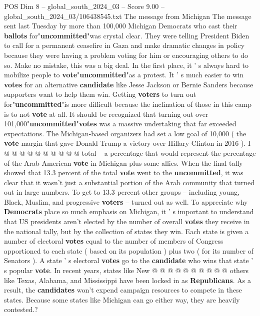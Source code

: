 \begin{textsample}{POS Dim 8 – global\_south\_2024\_03 – Score 9.00 – global\_south\_2024\_03/106438545.txt}  \label{ex:f8_pos_093}
The message from Michigan The message sent last Tuesday by more than 100,000 Michigan Democrats who cast their \textbf{ballots} for"\textbf{uncommitted}"was crystal clear.
They were telling President Biden to call for a permanent ceasefire in Gaza and make dramatic changes in policy because they were having a problem voting for him or encouraging others to do so.
Make no mistake, this was a big deal.
In the first place, it ' s always hard to mobilize people to \textbf{vote}"\textbf{uncommitted}"as a protest.
It ' s much easier to win \textbf{votes} for an alternative \textbf{candidate} like Jesse Jackson or Bernie Sanders because supporters want to help them win.
Getting \textbf{voters} to turn out for"\textbf{uncommitted}"is more difficult because the inclination of those in this camp is to not \textbf{vote} at all.
It should be recognized that turning out over 101,000"\textbf{uncommitted}"\textbf{votes} was a massive undertaking that far exceeded expectations.
The Michigan-based organizers had set a low goal of 10,000 ( the \textbf{vote} margin that gave Donald Trump a victory over Hillary Clinton in 2016 ).
I @ @ @ @ @ @ @ @ @ @ total -- a percentage that would represent the percentage of the Arab American \textbf{vote} in Michigan plus some allies.
When the final tally showed that 13.3 percent of the total \textbf{vote} went to the \textbf{uncommitted}, it was clear that it wasn't just a substantial portion of the Arab community that turned out in large numbers.
To get to 13.3 percent other groups -- including young, Black, Muslim, and progressive \textbf{voters} -- turned out as well.
To appreciate why \textbf{Democrats} place so much emphasis on Michigan, it ' s important to understand that US presidents aren't elected by the number of overall \textbf{votes} they receive in the national tally, but by the collection of states they win.
Each state is given a number of electoral \textbf{votes} equal to the number of members of Congress apportioned to each state ( based on its population ) plus two ( for its number of Senators ).
A state ' s electoral \textbf{votes} go to the \textbf{candidate} who wins that state ' s popular \textbf{vote}.
In recent years, states like New @ @ @ @ @ @ @ @ @ @ others like Texas, Alabama, and Mississippi have been locked in as \textbf{Republicans}.
As a result, the \textbf{candidates} won't expend campaign resources to compete in these states.
Because some states like Michigan can go either way, they are heavily contested.?

\end{textsample}

